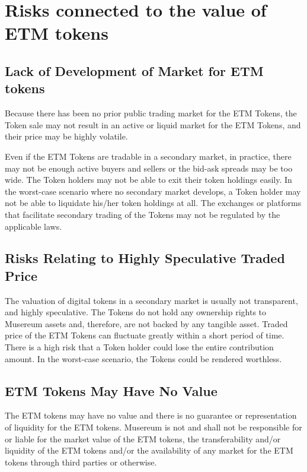 \documentclass[12pt]{report}
\begin{document}
\section{Risks connected to the value of ETM tokens}
\label{risks-value}

\subsection*{Lack of Development of Market for ETM tokens}
\label{risks-value-lack}
Because there has been no prior public trading market for the ETM Tokens, the Token sale may not result in an active or liquid market for the ETM Tokens, and their price may be highly volatile.

Even if the ETM Tokens are tradable in a secondary market, in practice, there may not be enough active buyers and sellers or the bid-ask spreads may be too wide. The Token holders may not be able to exit their token holdings easily. In the worst-case scenario where no secondary market develops, a Token holder may not be able to liquidate his/her token holdings at all. The exchanges or platforms that facilitate secondary trading of the Tokens may not be regulated by the applicable laws.

\subsection*{Risks Relating to Highly Speculative Traded Price}
\label{risks-value-speculative}
The valuation of digital tokens in a secondary market is usually not transparent, and highly speculative. The Tokens do not hold any ownership rights to Musereum assets and, therefore, are not backed by any tangible asset. Traded price of the ETM Tokens can fluctuate greatly within a short period of time. There is a high risk that a Token holder could lose the entire contribution amount. In the worst-case scenario, the Tokens could be rendered worthless.

\subsection*{ETM Tokens May Have No Value}
\label{risks-value-no-value}
The ETM tokens may have no value and there is no guarantee or representation of liquidity for the ETM tokens. Musereum is not and shall not be responsible for or liable for the market value of the ETM tokens, the transferability and/or liquidity of the ETM tokens and/or the availability of any market for the ETM tokens through third parties or otherwise.
\end{document}
